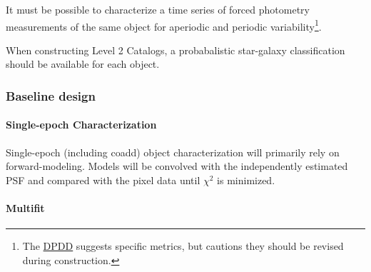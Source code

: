 \documentclass[12pt]{article}
\newcommand{\ds}[2]{{\color{blue} \href{https://docushare.lsstcorp.org/docushare/dsweb/Get/#1}{#2}}\xspace}
\newcommand{\DPDD}{\ds{LSE-163}{DPDD}}
\newcommand{\wbsPSF}{WBS 02C.04.03}
\begin{document}
It must be possible to characterize a time series of forced photometry measurements of the same object for aperiodic and periodic variability\footnote{The \DPDD{} suggests specific metrics, but cautions they should be revised during construction.}.

When constructing Level 2 Catalogs, a probabalistic star-galaxy classification should be available for each object.

\subsubsection{Baseline design}

\paragraph{Single-epoch Characterization}

Single-epoch (including coadd) object characterization will primarily rely on forward-modeling. Models will be convolved with the independently estimated PSF and compared with the pixel data until $\chi^2$ is minimized. %


\paragraph{Multifit}
\end{document}
